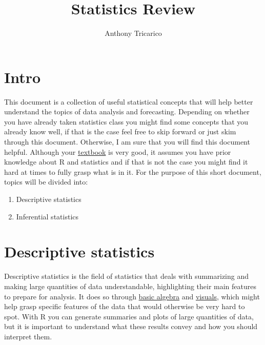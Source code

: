 \documentclass[
  letterpaper,
  DIV=11,
  numbers=noendperiod]{scrartcl}
\title{Statistics Review}
\author{Anthony Tricarico}
\date{}
\providecommand{\tightlist}{%
  \setlength{\itemsep}{0pt}\setlength{\parskip}{0pt}}\usepackage{longtable,booktabs,array}
\renewcommand*\contentsname{Table of contents}
\newcommand\contentsname{Table of contents}
\begin{document}
\maketitle

\renewcommand*\contentsname{Table of contents}
{
\hypersetup{linkcolor=}
\setcounter{tocdepth}{3}
\tableofcontents
}

\section{Intro}\label{intro}

This document is a collection of useful statistical concepts that will
help better understand the topics of data analysis and forecasting.
Depending on whether you have already taken statistics class you might
find some concepts that you already know well, if that is the case feel
free to skip forward or just skim through this document. Otherwise, I am
sure that you will find this document helpful. Although your
\href{https://otexts.com/fpp3/index.html}{textbook} is very good, it
assumes you have prior knowledge about R and statistics and if that is
not the case you might find it hard at times to fully grasp what is in
it. For the purpose of this short document, topics will be divided into:

\begin{enumerate}
\def\labelenumi{\arabic{enumi}.}
\tightlist
\item
  Descriptive statistics
\item
  Inferential statistics
\end{enumerate}

\section{Descriptive statistics}\label{descriptive-statistics}

Descriptive statistics is the field of statistics that deals with
summarizing and making large quantities of data understandable,
highlighting their main features to prepare for analysis. It does so
through \href{https://www.khanacademy.org/math/algebra-basics}{basic
algebra} and
\href{https://towardsdatascience.com/a-comprehensive-guide-to-the-grammar-of-graphics-for-effective-visualization-of-multi-dimensional-1f92b4ed4149}{visuals},
which might help grasp specific features of the data that would
otherwise be very hard to spot. With R you can generate summaries and
plots of large quantities of data, but it is important to understand
what these results convey and how you should interpret them.
\end{document}
